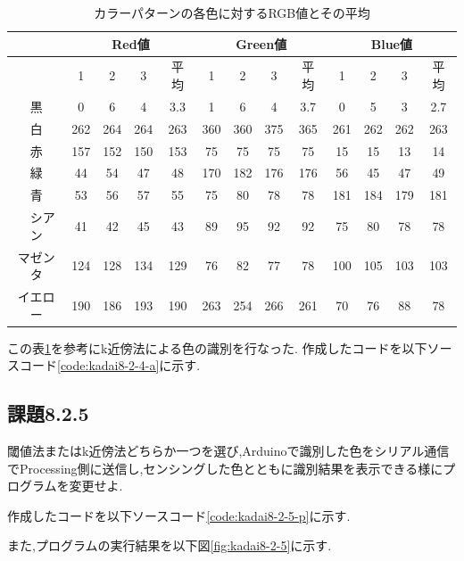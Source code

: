 \documentclass{jarticle}
\begin{document}
\begin{table}[H]
\caption{カラーパターンの各色に対するRGB値とその平均}
	\begin{center}
		\begin{tabular}{|c|c|c|c|c|c|c|c|c|c|c|c|c|}\hline 
		& \multicolumn{4}{c|}{Red値} & \multicolumn{4}{c|}{Green値} & \multicolumn{4}{c|}{Blue値} \\ \hline
			& 1 & 2 & 3 &平均& 1 & 2 & 3 &平均& 1 & 2 & 3 &平均 \\ \hline
		黒 & 0 & 6 & 4 & 3.3& 1 & 6 & 4 & 3.7& 0 & 5 & 3 & 2.7 \\ \hline
		白 &262&264&264&263 &360&360&375&365&261&262&262&263 \\ \hline
		赤 &157&152&150& 153&75 &75 & 75& 75& 15& 15& 13&14 \\ \hline
		緑 & 44& 54 &47& 48 &170&182&176&176& 56& 45& 47&49 \\ \hline
		青 & 53& 56 &57& 55 & 75&80 &78 & 78&181&184&179&181 \\ \hline
　シアン & 41& 42& 45& 43 & 89& 95& 92& 92& 75& 80& 78& 78\\ \hline
 マゼンタ&124&128&134& 129& 76& 82& 77& 78&100&105&103& 103\\ \hline
 イエロー&190&186&193& 190&263&254&266&261& 70& 76& 88& 78\\ \hline
		\end{tabular}
	\end{center}
\label{table:kadai8-2-4} 
\end{table}

この表\ref{table:kadai8-2-4}を参考にk近傍法による色の識別を行なった.
作成したコードを以下ソースコード\ref{code:kadai8-2-4-a}に示す.



\subsection{課題8.2.5}
閾値法またはk近傍法どちらか一つを選び,Arduinoで識別した色をシリアル通信でProcessing側に送信し,センシングした色とともに識別結果を表示できる様にプログラムを変更せよ.

作成したコードを以下ソースコード\ref{code:kadai8-2-5-p}に示す.



また,プログラムの実行結果を以下図\ref{fig:kadai8-2-5}に示す.
\end{document}
